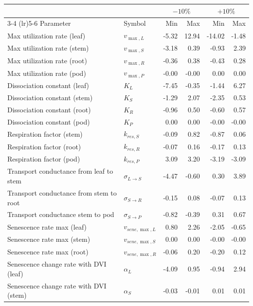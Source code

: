 \centering
\begin{tabular}{llrrrr}
  \toprule
  & & \multicolumn{2}{c}{$-10\%$} & \multicolumn{2}{c}{$+10\%$} \\
  \cmidrule(lr){3-4} \cmidrule(lr){5-6}
  Parameter & Symbol & Min & Max & Min & Max \\
  \midrule
  Max utilization rate (leaf) & $v_{\max,L}$ & -5.32 & 12.94 & -14.02 & -1.48 \\
  Max utilization rate (stem) & $v_{\max,S}$ & -3.18 & 0.39 & -0.93 & 2.39 \\
  Max utilization rate (root) & $v_{\max,R}$ & -0.36 & 0.38 & -0.43 & 0.28 \\
  Max utilization rate (pod) & $v_{\max,P}$ & -0.00 & -0.00 & 0.00 & 0.00 \\
  Dissociation constant (leaf) & $K_{L}$ & -7.45 & -0.35 & -1.44 & 6.27 \\
  Dissociation constant (stem) & $K_{S}$ & -1.29 & 2.07 & -2.35 & 0.53 \\
  Dissociation constant (root) & $K_{R}$ & -0.96 & 0.50 & -0.60 & 0.57 \\
  Dissociation constant (pod) & $K_{P}$ & 0.00 & 0.00 & -0.00 & -0.00 \\
  Respiration factor (stem) & $k_{res,S}$ & -0.09 & 0.82 & -0.87 & 0.06 \\
  Respiration factor (root) & $k_{res,R}$ & -0.07 & 0.16 & -0.17 & 0.13 \\
  Respiration factor (pod) & $k_{res,P}$ & 3.09 & 3.20 & -3.19 & -3.09 \\
  Transport conductance from leaf to stem & $\sigma_{L \to S}$ & -4.47 & -0.60 & 0.30 & 3.89 \\
  Transport conductance from stem to root & $\sigma_{S \to R}$ & -0.15 & 0.08 & -0.07 & 0.13 \\
  Transport conductance stem to pod & $\sigma_{S \to P}$ & -0.82 & -0.39 & 0.31 & 0.67 \\
  Senescence rate max (leaf) & $v_{sene,\max,L}$ & 0.80 & 2.26 & -2.05 & -0.65 \\
  Senescence rate max (stem) & $v_{sene,\max,S}$ & 0.00 & 0.00 & -0.00 & -0.00 \\
  Senescence rate max (root) & $v_{sene,\max,R}$ & -0.06 & 0.20 & -0.20 & 0.12 \\
  Senescence change rate with DVI (leaf) & $\alpha_{L}$ & -4.09 & 0.95 & -0.94 & 2.94 \\
  Senescence change rate with DVI (stem) & $\alpha_{S}$ & -0.03 & -0.01 & 0.01 & 0.01 \\

\end{tabular}
